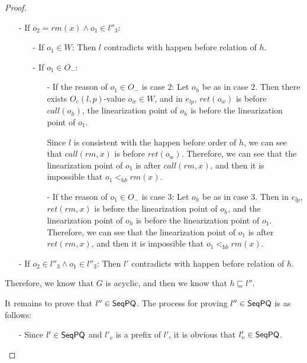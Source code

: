 \begin {proof}
\begin{itemize}
\item[-] If $o_2 = \textit{rm}(x) \wedge o_1 \in l''_3$:
    \begin{itemize}
    \setlength{\itemsep}{0.5pt}
    \item[-] If $o_1 \in W$: Then $l$ contradicts with happen before relation of $h$.

    \item[-] If $o_1 \in O_-$:
         \begin{itemize}
         \setlength{\itemsep}{0.5pt}
         \item[-] If the reason of $o_1 \in O_-$ is case $2$: Let $o_h$ be as in case $2$. Then there exists $O_c(l,p)$-value $o_w \in W$, and in $e_{\textit{lp}}$, $\textit{ret}(o_w)$ is before $\textit{call}(o_h)$, the linearization point of $o_h$ is before the linearization point of $o_1$.

             Since $l$ is consistent with the happen before order of $h$, we can see that $\textit{call}(\textit{rm},x)$ is before $\textit{ret}(o_w)$. Therefore, we can see that the linearization point of $o_1$ is after $\textit{call}(\textit{rm},x)$, and then it is impossible that $o_1 <_{\textit{hb}} \textit{rm}(x)$.

         \item[-] If the reason of $o_1 \in O_-$ is case $3$: Let $o_h$ be as in case $3$. Then in $e_{\textit{lp}}$, $\textit{ret}(\textit{rm},x)$ is before the linearization point of $o_h$, and the linearization point of $o_h$ is before the linearization point of $o_1$. Therefore, we can see that the linearization point of $o_1$ is after $\textit{ret}(\textit{rm},x)$, and then it is impossible that $o_1 <_{\textit{hb}} \textit{rm}(x)$.
         \end{itemize}
    \end{itemize}

\item[-] If $o_2 \in l''_3 \wedge o_1 \in l''_3$: Then $l'$ contradicts with happen before relation of $h$.
\end{itemize}

Therefore, we know that $G$ is acyclic, and then we know that $h \sqsubseteq l''$.

It remains to prove that $l'' \in \mathsf{SeqPQ}$. The process for proving $l'' \in \mathsf{SeqPQ}$ is as follows:

\begin{itemize}
\setlength{\itemsep}{0.5pt}
\item[-] Since $l' \in \mathsf{SeqPQ}$ and $l'_v$ is a prefix of $l'$, it is obvious that $l'_v \in \mathsf{SeqPQ}$.


\end{itemize}
\end{proof}
